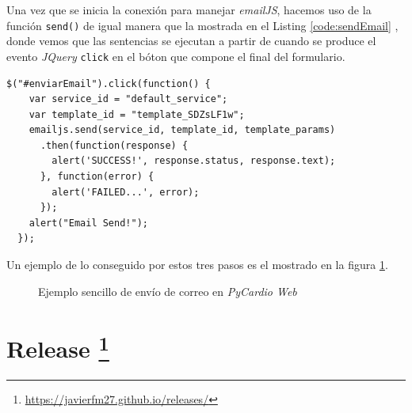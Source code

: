 Una vez que se inicia la conexión para manejar \textit{emailJS}, hacemos uso de la función \texttt{send()} de igual manera que la mostrada en el Listing \ref{code:sendEmail} , donde vemos que las sentencias se ejecutan a partir de cuando se produce el evento \textit{JQuery} \texttt{click} en el bóton que compone el final del formulario.

\begin{lstlisting}[caption=Código que produce el envío de correo,label={code:sendEmail}]
  $("#enviarEmail").click(function() {
    var service_id = "default_service";
    var template_id = "template_SDZsLF1w";
    emailjs.send(service_id, template_id, template_params)
      .then(function(response) {
        alert('SUCCESS!', response.status, response.text);
      }, function(error) {
        alert('FAILED...', error);
      });
    alert("Email Send!");
  });
\end{lstlisting}

Un ejemplo de lo conseguido por estos tres pasos es el mostrado en la figura \ref{fig:sendEmail}.

\begin{figure}[H]
    \centering
    \caption{Ejemplo sencillo de envío de correo en \textit{PyCardio Web}}
    \label{fig:sendEmail}
\end{figure}

\section[Release]{Release \footnote{\url{https://javierfm27.github.io/releases/}}}
\label{sec:releaseWeb}

